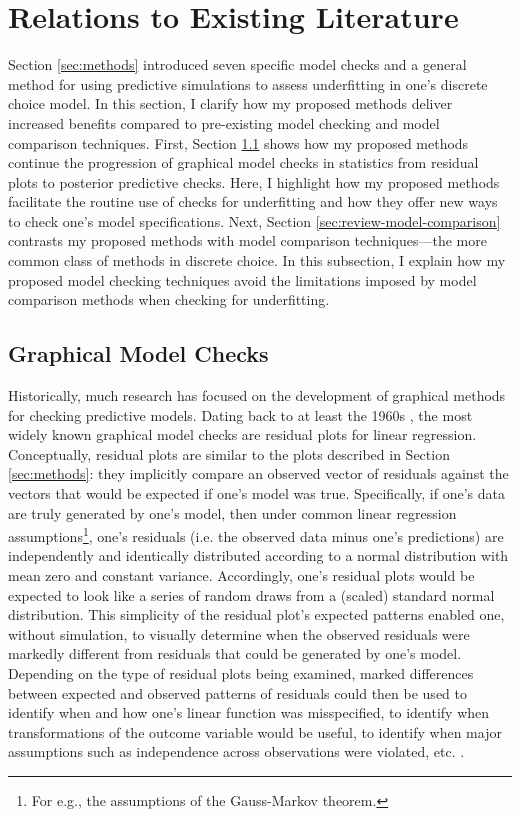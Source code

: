 \documentclass[preprint]{elsarticle}
\begin{document}
\section{Relations to Existing Literature}
\label{sec:lit-review}
Section \ref{sec:methods} introduced seven specific model checks and a general method for using predictive simulations to assess underfitting in one's discrete choice model. In this section, I clarify how my proposed methods deliver increased benefits compared to pre-existing model checking and model comparison techniques. First, Section \ref{sec:review-graphical-checks} shows how my proposed methods continue the progression of graphical model checks in statistics from residual plots to posterior predictive checks. Here, I highlight how my proposed methods facilitate the routine use of checks for underfitting and how they offer new ways to check one's model specifications. Next, Section \ref{sec:review-model-comparison} contrasts my proposed methods with model comparison techniques---the more common class of methods in discrete choice. In this subsection, I explain how my proposed model checking techniques avoid the limitations imposed by model comparison methods when checking for underfitting.

\subsection{Graphical Model Checks}
\label{sec:review-graphical-checks}
Historically, much research has focused on the development of graphical methods for checking predictive models. Dating back to at least the 1960s \citep{anscombe_examination_1963, cox_general_1968}, the most widely known graphical model checks are residual plots for linear regression. Conceptually, residual plots are similar to the plots described in Section \ref{sec:methods}: they implicitly compare an observed vector of residuals against the vectors that would be expected if one's model was true. Specifically, if one's data are truly generated by one's model, then under common linear regression assumptions\footnote{For e.g., the assumptions of the Gauss-Markov theorem.}, one's residuals (i.e. the observed data minus one's predictions) are independently and identically distributed according to a normal distribution with mean zero and constant variance. Accordingly, one's residual plots would be expected to look like a series of random draws from a (scaled) standard normal distribution. This simplicity of the residual plot's expected patterns enabled one, without simulation, to visually determine when the observed residuals were markedly different from residuals that could be generated by one's model. Depending on the type of residual plots being examined, marked differences between expected and observed patterns of residuals could then be used to identify when and how one's linear function was misspecified, to identify when transformations of the outcome variable would be useful, to identify when major assumptions such as independence across observations were violated, etc. \citep{anscombe_examination_1963, cox_general_1968}.
\end{document}
